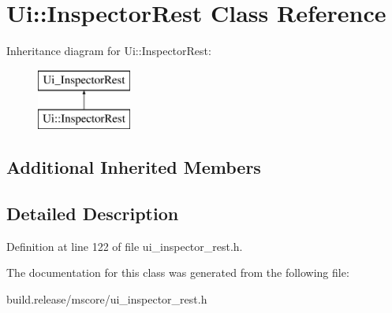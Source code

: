 \hypertarget{class_ui_1_1_inspector_rest}{}\section{Ui\+:\+:Inspector\+Rest Class Reference}
\label{class_ui_1_1_inspector_rest}
Inheritance diagram for Ui\+:\+:Inspector\+Rest\+:\begin{figure}[H]
\begin{center}
\leavevmode
\includegraphics[height=2.000000cm]{class_ui_1_1_inspector_rest}
\end{center}
\end{figure}
\subsection*{Additional Inherited Members}


\subsection{Detailed Description}


Definition at line 122 of file ui\+\_\+inspector\+\_\+rest.\+h.



The documentation for this class was generated from the following file\+:\begin{DoxyCompactItemize}
\item 
build.\+release/mscore/ui\+\_\+inspector\+\_\+rest.\+h\end{DoxyCompactItemize}
